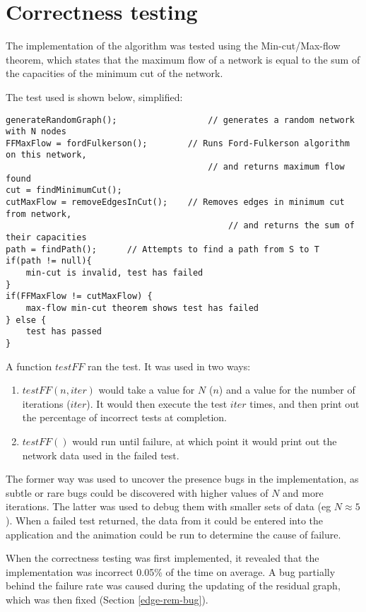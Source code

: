 \documentclass{l4proj}
\begin{document}
\section{Correctness testing}
The implementation of the algorithm was tested using the Min-cut/Max-flow theorem, which states that the maximum flow of a network is equal to the sum of the capacities of the minimum cut of the network.

The test used is shown below, simplified:
\begin{lstlisting}
generateRandomGraph();                  // generates a random network with N nodes
FFMaxFlow = fordFulkerson();        // Runs Ford-Fulkerson algorithm on this network,
                                        // and returns maximum flow found
cut = findMinimumCut();
cutMaxFlow = removeEdgesInCut();    // Removes edges in minimum cut from network,
                                            // and returns the sum of their capacities
path = findPath();      // Attempts to find a path from S to T
if(path != null){
    min-cut is invalid, test has failed
}
if(FFMaxFlow != cutMaxFlow) {
    max-flow min-cut theorem shows test has failed
} else {
    test has passed
}
\end{lstlisting}

A function $testFF$ ran the test. It was used in two ways:

\begin{enumerate}
    \item $testFF(n, iter)$ would take a value for $N$ ($n$) and a value for the number of iterations ($iter$). It would then execute the test $iter$ times, and then print out the percentage of incorrect tests at completion.
    \item  $testFF()$ would run until failure, at which point it would print out the network data used in the failed test.
\end{enumerate}

The former way was used to uncover the presence bugs in the implementation, as subtle or rare bugs could be discovered with higher values of $N$ and more iterations. The latter was used to debug them with smaller sets of data (eg $N \approx 5$). When a failed test returned, the data from it could be entered into the application and the animation could be run to determine the cause of failure.

When the correctness testing was first implemented, it revealed that the implementation was incorrect 0.05\% of the time on average. A bug partially behind the failure rate was caused during the updating of the residual graph, which was then fixed (Section \ref{edge-rem-bug}).
\end{document}
